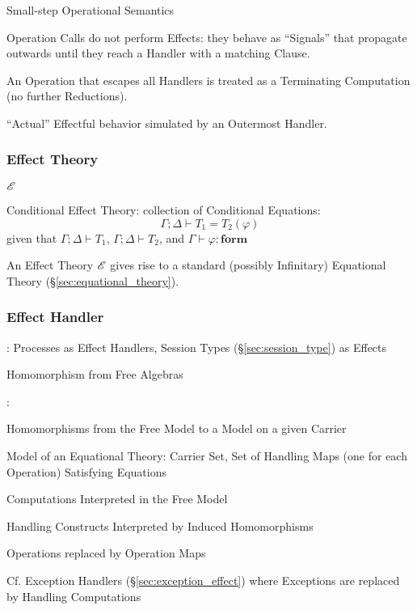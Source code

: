 Small-step Operational Semantics

Operation Calls do not perform Effects: they behave as ``Signals''
that propagate outwards until they reach a Handler with a matching
Clause. \cite{pretnar15}

An Operation that escapes all Handlers is treated as a Terminating
Computation (no further Reductions). \cite{pretnar15}

``Actual'' Effectful behavior simulated by an Outermost Handler.
\cite{pretnar15}



\subsubsection{Effect Theory}\label{sec:effect_theory}
\cite{plotkin-pretnar09}

$\mathscr{E}$

Conditional Effect Theory: collection of Conditional Equations:
\[
  \Gamma; \Delta \vdash T_1 = T_2(\varphi)
\]
given that $\Gamma; \Delta \vdash T_1$, $\Gamma; \Delta \vdash T_2$,
and $\Gamma \vdash \varphi : \mathbf{form}$

An Effect Theory $\mathscr{E}$ gives rise to a standard (possibly
Infinitary) Equational Theory (\S\ref{sec:equational_theory}).
\cite{plotkin-pretnar09}



\subsubsection{Effect Handler}\label{sec:effect_handler}

\cite{orchard-yoshida16}: Processes as Effect Handlers, Session Types
(\S\ref{sec:session_type}) as Effects

Homomorphism from Free Algebras
\cite{bauer-pretnar12}

\cite{plotkin-pretnar13}:

Homomorphisms from the Free Model to a Model on a given Carrier

Model of an Equational Theory: Carrier Set, Set of Handling Maps (one
for each Operation) Satisfying Equations

Computations Interpreted in the Free Model

Handling Constructs Interpreted by Induced Homomorphisms

Operations replaced by Operation Maps

\fist Cf. Exception Handlers (\S\ref{sec:exception_effect}) where
Exceptions are replaced by Handling Computations

